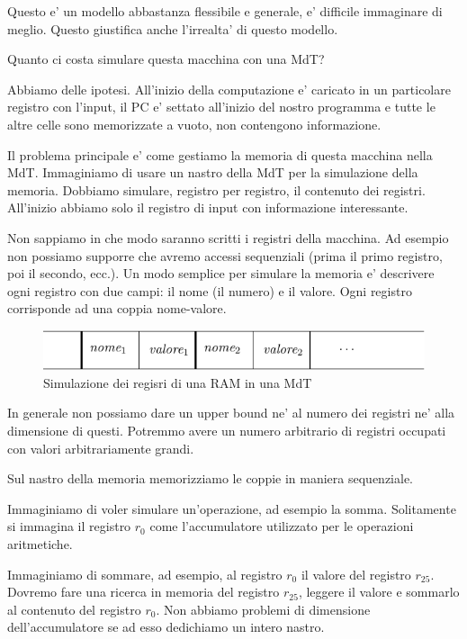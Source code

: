 Questo e' un modello abbastanza flessibile e generale, e' difficile immaginare di meglio. Questo
giustifica anche l'irrealta' di questo modello.

Quanto ci costa simulare questa macchina con una MdT? 

Abbiamo delle ipotesi. All'inizio della computazione e' caricato in un particolare registro con
l'input, il PC e' settato all'inizio del nostro programma e tutte le altre celle sono memorizzate a
vuoto, non contengono informazione.

Il problema principale e' come gestiamo la memoria di questa macchina nella MdT. Immaginiamo di
usare un nastro della MdT per la simulazione della memoria. Dobbiamo simulare, registro per
registro, il contenuto dei registri. All'inizio abbiamo solo il registro di input con informazione
interessante.

Non sappiamo in che modo saranno scritti i registri della macchina. Ad esempio non possiamo supporre
che avremo accessi sequenziali (prima il primo registro, poi il secondo, ecc.). Un modo semplice per
simulare la memoria e' descrivere ogni registro con due campi: il nome (il numero) e il valore. Ogni
registro corrisponde ad una coppia nome-valore.

\begin{figure}[h]
    \begin{center}
        \includegraphics{./img/deterministic_complexity_classes/RAMsimulation.pdf}
        \caption{Simulazione dei regisri di una RAM in una MdT}
    \end{center}
\end{figure}

In generale non possiamo dare un upper bound ne' al numero dei registri ne' alla dimensione di
questi. Potremmo avere un numero arbitrario di registri occupati con valori arbitrariamente grandi.

Sul nastro della memoria memorizziamo le coppie in maniera sequenziale.

Immaginiamo di voler simulare un'operazione, ad esempio la somma. Solitamente si immagina il
registro $r_{0}$ come l'accumulatore utilizzato per le operazioni aritmetiche.

Immaginiamo di sommare, ad esempio, al registro $r_{0}$ il valore del registro $r_{25}$. Dovremo
fare una ricerca in memoria del registro $r_{25}$, leggere il valore e sommarlo al contenuto del
registro $r_{0}$. Non abbiamo problemi di dimensione dell'accumulatore se ad esso dedichiamo un
intero nastro.

